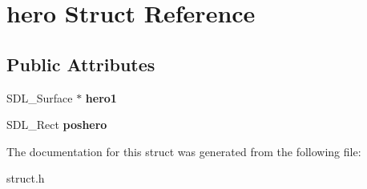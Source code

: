 \hypertarget{structhero}{}\section{hero Struct Reference}
\label{structhero}
\subsection*{Public Attributes}
\begin{DoxyCompactItemize}
\item 
S\+D\+L\+\_\+\+Surface $\ast$ {\bfseries hero1}\hypertarget{structhero_abf95c05a70fbbd6e23a938d1baa34866}{}\label{structhero_abf95c05a70fbbd6e23a938d1baa34866}

\item 
S\+D\+L\+\_\+\+Rect {\bfseries poshero}\hypertarget{structhero_a526ae6bc25ae789797cd7c61447aab51}{}\label{structhero_a526ae6bc25ae789797cd7c61447aab51}

\end{DoxyCompactItemize}


The documentation for this struct was generated from the following file\+:\begin{DoxyCompactItemize}
\item 
struct.\+h\end{DoxyCompactItemize}
